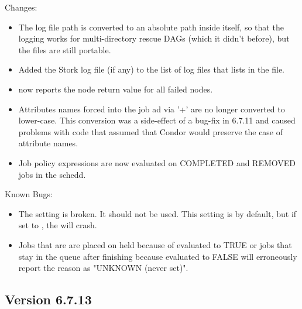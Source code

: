 \noindent Changes:

\begin{itemize}

\item The  log file path is converted to an absolute
path inside  itself, so that the logging works for
multi-directory rescue DAGs (which it didn't before), but the
 files are still portable.

\item Added the Stork log file (if any) to the list of log files that
 lists in the  file.

\item {} now reports the node return value for all failed
nodes.

\item Attributes names forced into the job ad via '+' are no longer
converted to lower-case. This conversion was a side-effect of a bug-fix
in 6.7.11 and caused problems with code that assumed that Condor would
preserve the case of attribute names.

\item Job policy expressions are now evaluated on COMPLETED and REMOVED
jobs in the schedd.

\end{itemize}

\noindent Known Bugs:

\begin{itemize}

\item The  setting is broken.
  It should not be used.
  This setting is \verb@FALSE@ by default, but if set to \verb@TRUE@,
  the  will crash.  

\item Jobs that are are placed on held because of 
evaluated to TRUE or jobs that stay in the queue after finishing because
 evaluated to FALSE will erroneously report the reason
as "UNKNOWN (never set)".

\end{itemize}


\subsection*{\label{sec:New-6-7.13}Version 6.7.13}

